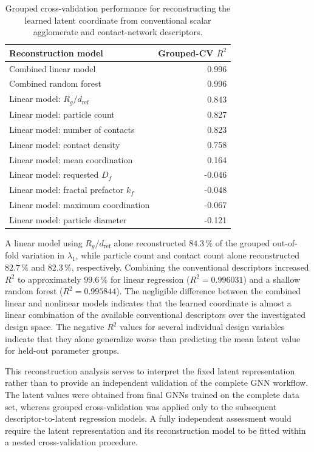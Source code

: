 \documentclass[12pt,a4paper]{article}
\begin{document}
\begin{table}[!tbp]
	\centering
	\caption{Grouped cross-validation performance for reconstructing the
		learned latent coordinate from conventional scalar agglomerate and
		contact-network descriptors.}
	\label{tab:latent_reconstruction}
	\begin{tabular}{lr}
		\toprule
		\textbf{Reconstruction model} & \textbf{Grouped-CV $R^2$} \\
		\midrule
		Combined linear model                    &  0.996 \\
		Combined random forest                   &  0.996 \\
		Linear model: $R_g/d_{\mathrm{ref}}$     &  0.843 \\
		Linear model: particle count             &  0.827 \\
		Linear model: number of contacts         &  0.823 \\
		Linear model: contact density            &  0.758 \\
		Linear model: mean coordination          &  0.164 \\
		Linear model: requested $D_f$            & -0.046 \\
		Linear model: fractal prefactor $k_f$    & -0.048 \\
		Linear model: maximum coordination       & -0.067 \\
		Linear model: particle diameter          & -0.121 \\
		\bottomrule
	\end{tabular}
\end{table}

A linear model using $R_g/d_{\mathrm{ref}}$ alone reconstructed $84.3\,\%$ of
the grouped out-of-fold variation in $\lambda_1$, while particle count and
contact count alone reconstructed $82.7\,\%$ and $82.3\,\%$, respectively.
Combining the conventional descriptors increased $R^2$ to approximately
$99.6\,\%$ for linear regression ($R^2=0.996031$) and a shallow random forest
($R^2=0.995844$).
The negligible difference between the combined linear and nonlinear models
indicates that the learned coordinate is almost a linear combination of the
available conventional descriptors over the investigated design space. The
negative $R^2$ values for several individual design variables indicate that
they alone generalize worse than predicting the mean latent value for held-out
parameter groups.

This reconstruction analysis serves to interpret the fixed latent
representation rather than to provide an independent validation of the
complete GNN workflow. The latent values were obtained from final GNNs trained
on the complete data set, whereas grouped cross-validation was applied only to
the subsequent descriptor-to-latent regression models. A fully independent
assessment would require the latent representation and its reconstruction
model to be fitted within a nested cross-validation procedure.
\end{document}
